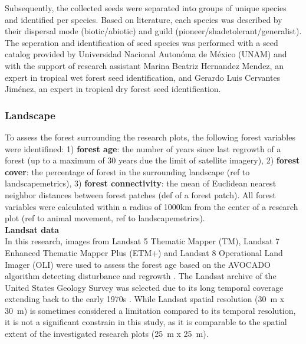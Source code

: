 Subsequently, the collected seeds were separated into groups of unique species and identified per species. Based on literature, each species was described by their dispersal mode (biotic/abiotic) and guild (pioneer/shadetolerant/generalist). The seperation and identification of seed species was performed with a seed catalog provided by Universidad Nacional Autonóma de México (UNAM) and with the support of research assistant Marina Beatriz Hernandez Mendez, an expert in tropical wet forest seed identification, and Gerardo Luis Cervantes Jiménez, an expert in tropical dry forest seed identification. 


\subsubsection{Landscape}

To  assess the forest surrounding the research plots, the following forest variables were identifined: 1) \textbf{forest age}: the number of years since last regrowth of a forest (up to a maximum of 30 years due the limit of satellite imagery), 2) \textbf{forest cover}: the percentage of forest in the surrounding landscape (ref to landscapemetrics), 3) \textbf{forest connectivity}: the mean of Euclidean nearest neighbor distances between forest patches (def of a forest patch). All forest variables were calculated within a radius of 1000km from the center of a research plot (ref to animal movement, ref to landscapemetrics).  \\

\textbf{Landsat data}\\

In this research, images from Landsat 5 Thematic Mapper (TM), Landsat 7 Enhanced Thematic Mapper Plus (ETM+) and Landsat 8 Operational Land Imager (OLI) were used to assess the forest age based on the AVOCADO algorithm detecting disturbance and regrowth \citep{decuyperContinuousMonitoringForest2022}. The Landsat archive of the United States Geology Survey was selected due to its long temporal coverage extending back to the early 1970s \citep{kennedyBringingEcologicalView2014, finerCombatingDeforestationSatellite2018}. While Landsat spatial resolution (30~m x 30~m) is sometimes considered a limitation compared to its temporal resolution, it is not a significant constrain in this study, as it is comparable to the spatial extent of the investigated research plots (25~m x 25~m). 

